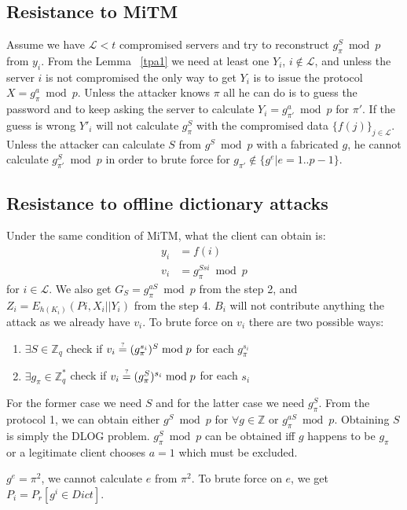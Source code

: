 \subsection{Resistance to MiTM}
Assume we have $\mathcal{L} < t$ compromised servers and try to
reconstruct $g_{\pi}^S \bmod p$ from ${y_i}$. From the Lemma
~\ref{tpa1} we need at least one $Y_i$, $i \notin \mathcal{L}$, and
unless the server $i$ is not compromised the only way to get $Y_i$ is
to issue the protocol $X = g_{\pi}^a \bmod p$. Unless the attacker
knows $\pi$ all he can do is to guess the password and to keep asking
the server to calculate $Y_i = g_{\pi'}^a \bmod p$ for $\pi'$. If the
guess is wrong $Y'_i$ will not calculate $g_{\pi}^S$ with the
compromised data $\{f(j)\}_{j \in \mathcal{L}}$.
Unless the attacker can calculate $S$ from $g^S \bmod p$ with a
fabricated $g$, he cannot calculate $g_{\pi'}^S \bmod p$ in
order to brute force for $g_{\pi'} \notin \{g^e | e = 1..p-1\}$.

\subsection{Resistance to offline dictionary attacks}
Under the same condition of MiTM, what the client can obtain is:
\begin{align*}
  y_i &= f(i) \\
  v_i &= g_{\pi}^{Ssi} \bmod p
\end{align*}
for $i \in \mathcal{L}$. We also get $G_S = g_{\pi}^{aS} \bmod p$ from
the step 2, and $Z_i = E_{h(K_i)}(Pi, X_i||Y_i)$ from the step
4. $B_i$ will not contribute anything the attack as we already have
$v_i$.
To brute force on $v_i$ there are two possible ways:
\begin{enumerate}
\item $\exists S \in \mathbb{Z}_q$ check if
  $v_i \stackrel{\text{\tiny ?}}{=} (g_{\pi}^{s_i})^S \bmod p$
  for each $g_{\pi}^{s_i}$ \\
\item $\exists g_{\pi} \in \mathbb{Z}^*_q$ check if
  $v_i \stackrel{\text{\tiny ?}}{=} (g_{\pi}^S)^{s_i} \bmod p$
  for each $s_i$
\end{enumerate}
For the former case we need $S$ and for the latter case we need
$g_{\pi}^S$. From the protocol 1, we can obtain either $g^S \bmod p$
for $\forall g \in \mathbb{Z}$ or $g_{\pi}^{aS} \bmod p$. Obtaining
$S$ is simply the {\sf DLOG} problem. $g_{\pi}^S \bmod p$ can be
obtained iff $g$ happens to be $g_{\pi}$ or a legitimate client
chooses $a = 1$ which must be excluded.

$g^e = \pi^2$, we cannot calculate $e$ from $\pi^2$. To brute force on
$e$, we get $P_i = P_r[g^i \in Dict]$.
